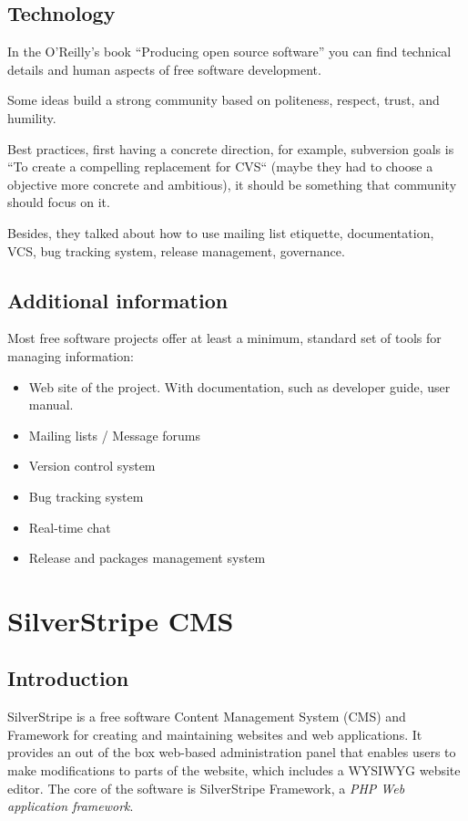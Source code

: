 \documentclass[11pt]{article}
\begin{document}
\subsection{Technology}
In the O'Reilly's book ``Producing open source software'' you can find technical details and human aspects of free software development.

Some ideas build a strong community based on politeness, respect, trust, and humility.

Best practices, first having a concrete direction, for example, subversion goals is ``To create a compelling replacement for CVS`` (maybe they had to choose a objective more concrete and ambitious), it should be something that community should focus on it.

Besides, they talked about how to use mailing list etiquette, documentation, VCS, bug tracking system, release management, governance.

\subsection{Additional information}
Most free software projects offer at least a minimum, standard set of tools for managing information:
\begin{itemize}
	\item Web site of the project. With documentation, such as developer guide, user manual.
	\item Mailing lists / Message forums
	\item Version control system
	\item Bug tracking system
	\item Real-time chat
	\item Release and packages management system
\end{itemize}

\newpage


\section{SilverStripe CMS}

\subsection{Introduction}
SilverStripe is a free software Content Management System (CMS) and Framework for creating and maintaining websites and web applications. It provides an out of the box web-based administration panel that enables users to make modifications to parts of the website, which includes a WYSIWYG website editor. The core of the software is SilverStripe Framework, a \emph{PHP Web application framework}.
\end{document}
